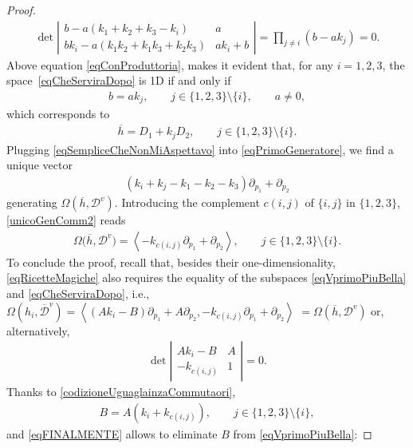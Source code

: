 \documentclass[pdftex]{sigma}
\newcommand{\D}{\mathcal{D}}
\newcommand{\Span}[1]{\left\langle #1 \right\rangle}
\numberwithin{equation}{section}
\begin{document}
\begin{proof}
\begin{gather}
\det \left|\begin{matrix}b-a(k_1+k_2+k_3-k_i) & a \\bk_i-a(k_1k_2+k_1k_3+k_2k_3) & ak_i+b\end{matrix}\right|=\prod_{j\neq i} (b-ak_j)=0.
\end{gather}
Above equation \eqref{eqConProduttoria}, makes it evident that, for any $i=1,2,3$, the space~\eqref{eqCheServiraDopo} is 1D if and only if
\begin{gather}\label{eqSempliceCheNonMiAspettavo}
b=ak_j,\qquad j\in\{1,2,3\}{\setminus}\{i\}, \qquad a\neq 0,
\end{gather}
which corresponds to
\begin{gather}\label{eqAccPrimo}
\overline{h}=D_1 +k_jD_2 ,\qquad j\in\{1,2,3\}{\setminus}\{i\}.
\end{gather}
Plugging \eqref{eqSempliceCheNonMiAspettavo} into \eqref{eqPrimoGeneratore}, we f\/ind a unique vector
\begin{gather}\label{unicoGenComm2}
(k_i+k_j-k_1-k_2-k_3) \partial_{p_{1}} + \partial_{p_{2}}
\end{gather}
generating $ \Omega(\overline{h}, {\D}^v) $. Introducing the complement $c(i,j)$ of $\{i,j\}$ in $\{1,2,3\}$, \eqref{unicoGenComm2} reads
\begin{gather*}%
 \Omega\big(\overline{h}, {\D}^v\big) = \Span{-k_{c(i,j)}\partial_{p_{1}} + \partial_{p_{2}} },\qquad j\in\{1,2,3\}{\setminus}\{i\}.
\end{gather*}
To conclude the proof, recall that, besides their one-dimensionality, \eqref{eqRicetteMagiche} also requires the equa\-li\-ty of the subspaces \eqref{eqVprimoPiuBella} and \eqref{eqCheServiraDopo}, i.e.,
$ \Omega(h_i,\overline{\D}^v)=\Span{( Ak_i-B)\partial_{p_{1}}+A\partial_{p_{2}} , -k_{c(i,j)}\partial_{p_{1}} + \partial_{p_{2}} }$ $= \Omega(\overline{h}, {\D}^v)$
or, alternatively,
 \begin{gather}\label{codizioneUguaglainzaCommutaori}
\det\left|\begin{matrix} Ak_i-B & A \\ -k_{c(i,j)} & 1 \end{matrix}\right| =0.
\end{gather}
Thanks to \eqref{codizioneUguaglainzaCommutaori},
 \begin{gather}\label{eqFINALMENTE}
B=A(k_i+k_{c(i,j)}),\qquad j\in\{1,2,3\}{\setminus}\{i\},
\end{gather}
and \eqref{eqFINALMENTE} allows to eliminate $B$ from \eqref{eqVprimoPiuBella}:

\end{proof}
\end{document}
